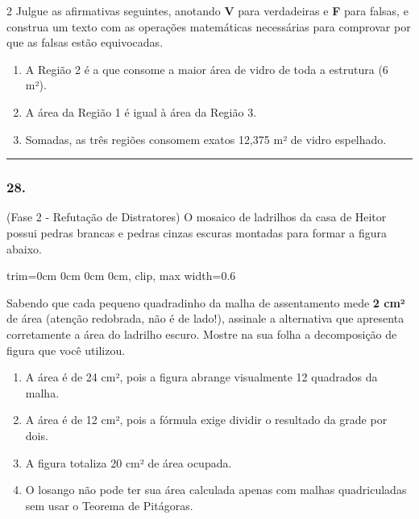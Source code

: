 \documentclass[twoside, 10pt, a4paper]{article}
\newlength{\espacoPreQuestao}\setlength{\espacoPreQuestao}{0.1cm}
\newlength{\espacoQuestao}\setlength{\espacoQuestao}{0.2cm}
\newlength{\espacoAlt}\setlength{\espacoAlt}{0.2cm}
\begin{document}
\begin{multicols*}{2}
Julgue as afirmativas seguintes, anotando \textbf{V} para verdadeiras e \textbf{F} para falsas, e construa um texto com as operações matemáticas necessárias para comprovar por que as falsas estão equivocadas.
\begin{enumerate}[label=\Roman*., itemsep=\espacoAlt]
    \item A Região 2 é a que consome a maior área de vidro de toda a estrutura (6 m²).
    \item A área da Região 1 é igual à área da Região 3.
    \item Somadas, as três regiões consomem exatos 12,375 m² de vidro espelhado.
\end{enumerate}
\par\vspace{\espacoQuestao}

\noindent\textcolor{CorLinha}{\rule{\linewidth}{0.5pt}} 
\par\vspace{\espacoPreQuestao}
\subsubsection*{28.} (Fase 2 - Refutação de Distratores) O mosaico de ladrilhos da casa de Heitor possui pedras brancas e pedras cinzas escuras montadas para formar a figura abaixo.

\begin{center}
\begin{adjustbox}{trim=0cm 0cm 0cm 0cm, clip, max width=0.6\linewidth}
\end{adjustbox}
\end{center}

Sabendo que cada pequeno quadradinho da malha de assentamento mede \textbf{2 cm²} de área (atenção redobrada, não é de lado!), assinale a alternativa que apresenta corretamente a área do ladrilho escuro. Mostre na sua folha a decomposição de figura que você utilizou.
\begin{enumerate}[label=\alph*), itemsep=\espacoAlt]
    \item A área é de 24 cm², pois a figura abrange visualmente 12 quadrados da malha.
    \item A área é de 12 cm², pois a fórmula exige dividir o resultado da grade por dois.
    \item A figura totaliza 20 cm² de área ocupada.
    \item O losango não pode ter sua área calculada apenas com malhas quadriculadas sem usar o Teorema de Pitágoras.
\end{enumerate}
\par\vspace{\espacoQuestao}


\end{multicols*}
\end{document}
